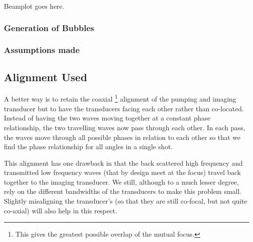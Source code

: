 Beamplot goes here.

\subsubsection{Generation of Bubbles}

\subsubsection{Assumptions made}




\subsection{Alignment Used}

A better way is to retain the coaxial%
\footnote{This gives the greatest possible overlap of the mutual focus.} alignment of the pumping and imaging transducer
but to have the transducers facing each other rather than co-located.
Instead of  having the two waves moving together at a constant phase relationship,
the two travelling waves  now pass through each other.
In each pass, the waves  move through all possible phases in relation to each other
so that we find the  phase relationship for all angles in a single shot.


This alignment has  one drawback in that the back scattered high frequency and transmitted low frequency waves 
(that by design meet at the focus)  travel back together to the imaging transducer.
We still, although to a much lesser degree, rely on the different bandwidths of the transducers to make this problem small.
Slightly misaligning the transducer's (so that they are still co-focal, but not quite co-axial) will also help in this respect.


